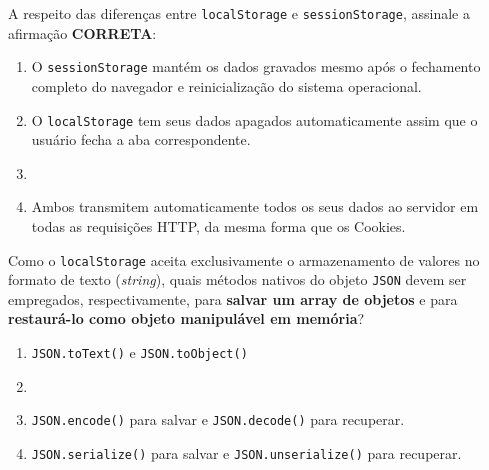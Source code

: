\begin{tcolorbox}[colback=white, colframe=azulTitulo, title=\textbf{Questão 6: Persistência no Navegador (Web Storage API)}]
    A respeito das diferenças entre \texttt{localStorage} e \texttt{sessionStorage}, assinale a afirmação \textbf{CORRETA}:
    \begin{enumerate}[label=\alph*)]
        \item O \texttt{sessionStorage} mantém os dados gravados mesmo após o fechamento completo do navegador e reinicialização do sistema operacional.
        \item O \texttt{localStorage} tem seus dados apagados automaticamente assim que o usuário fecha a aba correspondente.
        \item {}
        \item Ambos transmitem automaticamente todos os seus dados ao servidor em todas as requisições HTTP, da mesma forma que os Cookies.
    \end{enumerate}
\end{tcolorbox}

\begin{tcolorbox}[colback=white, colframe=azulTitulo, title=\textbf{Questão 7: Serialização JSON para Armazenamento Local}]
    Como o \texttt{localStorage} aceita exclusivamente o armazenamento de valores no formato de texto (\textit{string}), quais métodos nativos do objeto \texttt{JSON} devem ser empregados, respectivamente, para \textbf{salvar um array de objetos} e para \textbf{restaurá-lo como objeto manipulável em memória}?
    \begin{enumerate}[label=\alph*)]
        \item \texttt{JSON.toText()} e \texttt{JSON.toObject()}
        \item {}
        \item \texttt{JSON.encode()} para salvar e \texttt{JSON.decode()} para recuperar.
        \item \texttt{JSON.serialize()} para salvar e \texttt{JSON.unserialize()} para recuperar.
    \end{enumerate}
\end{tcolorbox}

